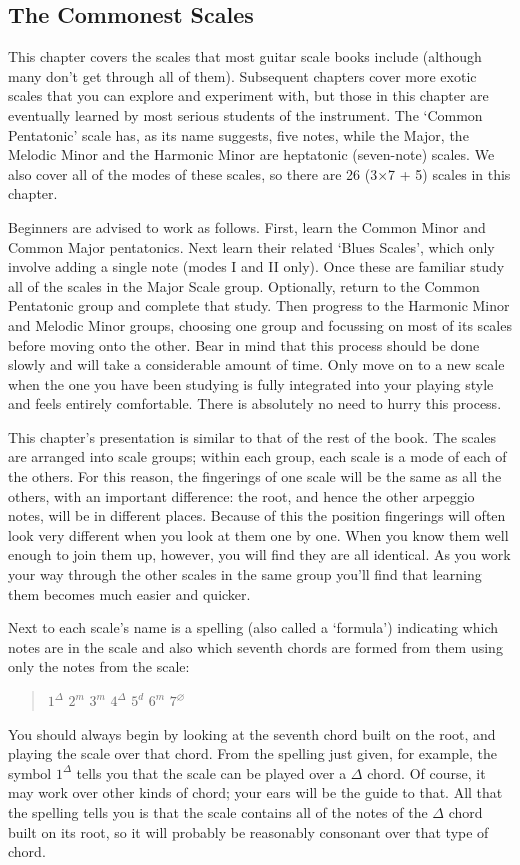 \documentclass[english]{./gbook}
\begin{document}
\begin{large}
\chapter{\mbox{The} \mbox{Commonest} \mbox{Scales}}

This chapter covers the scales that most guitar scale books include (although many don't get through all of them). Subsequent chapters cover more exotic scales that you can explore and experiment with, but those in this chapter are eventually learned by most serious students of the instrument. The `Common Pentatonic' scale has, as its name suggests, five notes, while the Major, the Melodic Minor and the Harmonic Minor are heptatonic (seven-note) scales. We also cover all of the modes of these scales, so there are 26 (3$\times$7 + 5) scales in this chapter. 

Beginners are advised to work as follows. First, learn the Common Minor and Common Major pentatonics. Next learn their related `Blues Scales', which only involve adding a single note (modes I and II only). Once these are familiar study all of the scales in the Major Scale group. Optionally, return to the Common Pentatonic group and complete that study. Then progress to the Harmonic Minor and Melodic Minor groups, choosing one group and focussing on most of its scales before moving onto the other. Bear in mind that this process should be done slowly and will take a considerable amount of time. Only move on to a new scale when the one you have been studying is fully integrated into your playing style and feels entirely comfortable. There is absolutely no need to hurry this process.

This chapter's presentation is similar to that of the rest of the book. The scales are arranged into scale groups; within each group, each scale is a mode of each of the others. For this reason, the fingerings of one scale will be the same as all the others, with an important difference: the root, and hence the other arpeggio notes, will be in different places. Because of this the position fingerings will often look very different when you look at them one by one. When you know them well enough to join them up, however, you will find they are all identical. As you work your way through the other scales in the same group you'll find that learning them becomes much easier and quicker.

Next to each scale's name is a spelling (also called a `formula') indicating which notes are in the scale and also which seventh chords are formed from them using only the notes from the scale:
\begin{quote}
	$1^{\Delta}$ $2^{m}$ $3^{m}$ $4^{\Delta}$ $5^{d}$ $6^{m}$ $7^{\varnothing}$
\end{quote}
You should always begin by looking at the seventh chord built on the root, and playing the scale over that chord. From the spelling just given, for example, the symbol $1^{\Delta}$ tells you that the scale can be played over a $\Delta$ chord. Of course, it may work over other kinds of chord; your ears will be the guide to that. All that the spelling tells you is that the scale contains all of the notes of the $\Delta$ chord built on its root, so it will probably be reasonably consonant over that type of chord.


\end{large}
\end{document}
